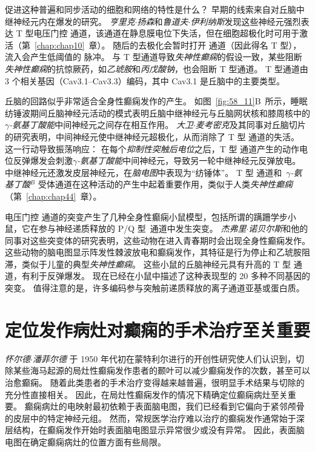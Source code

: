 促进这种普遍和同步活动的细胞和网络的特性是什么？
早期的线索来自对丘脑中继神经元内在爆发的研究。
\textit{亨里克$\cdot$扬森}和\textit{鲁道夫$\cdot$伊利纳斯}发现这些神经元强烈表达 T 型电压门控  通道，该通道在静息膜电位下失活，但在细胞超极化时可用于激活（第~\ref{chap:chap10}~章）。
随后的去极化会暂时打开  通道（因此得名 T 型）， 流入会产生低阈值的  脉冲。
与 T 型通道导致\textit{失神性癫痫}的假设一致，某些阻断\textit{失神性癫痫}的抗惊厥药，如\textit{乙琥胺}和\textit{丙戊酸钠}，也会阻断 T 型通道。
T 型通道由 3 个相关基因（Cav3.1–Cav3.3）编码，其中 Cav3.1 是丘脑中的主要类型。


丘脑的回路似乎非常适合全身性癫痫发作的产生。
如图~\ref{fig:58_11}B~所示，睡眠纺锤波期间丘脑神经元活动的模式表明丘脑中继神经元与丘脑网状核和膝周核中的\textit{$\gamma$-氨基丁酸能}中间神经元之间存在相互作用。
\textit{大卫$\cdot$麦考密克}及其同事对丘脑切片的研究表明，中间神经元使中继神经元超极化，从而消除了 T 型  通道的失活。
这一行动导致振荡响应：
在每个\textit{抑制性突触后电位}之后，T 型  通道产生的动作电位反弹爆发会刺激\textit{$\gamma$-氨基丁酸能}中间神经元，导致另一轮中继神经元反弹放电。
中继神经元还激发皮层神经元，在\textit{脑电图}中表现为“纺锤体”。
T 型  通道和~\textit{$\gamma$-氨基丁酸}$^B$ 受体通道在这种活动的产生中起着重要作用，类似于人类\textit{失神性癫痫}（第~\ref{chap:chap44}~章）。


电压门控  通道的突变产生了几种全身性癫痫小鼠模型，包括所谓的蹒跚学步小鼠，它在参与神经递质释放的 P/Q 型~通道中发生突变。
\textit{杰弗里$\cdot$诺贝尔斯}和他的同事对这些突变体的研究表明，这些动物在进入青春期时会出现全身性癫痫发作。
这些动物的脑电图显示阵发性棘波放电和癫痫发作，其特征是行为停止和乙琥胺阻滞，类似于儿童的典型\textit{失神性癫痫}。
这些小鼠的丘脑神经元具有升高的 T 型  通道，有利于反弹爆发。
现在已经在小鼠中描述了这种表现型的 20 多种不同基因的突变。
值得注意的是，许多编码参与突触前递质释放的离子通道亚基或蛋白质。



\section{定位发作病灶对癫痫的手术治疗至关重要}

\textit{怀尔德$\cdot$潘菲尔德 }于 1950 年代初在蒙特利尔进行的开创性研究使人们认识到，切除某些海马起源的局灶性癫痫发作患者的颞叶可以减少癫痫发作的次数，甚至可以治愈癫痫。
随着此类患者的手术治疗变得越来越普遍，很明显手术结果与切除的充分性直接相关。
因此，在局灶性癫痫发作的情况下精确定位癫痫病灶至关重要。
癫痫病灶的电映射最初依赖于表面脑电图，我们已经看到它偏向于紧邻颅骨的皮层中的特定神经元组。
然而，常规医学治疗难以治疗的癫痫发作通常始于深层结构，在癫痫发作开始时表面脑电图显示异常很少或没有异常。
因此，表面脑电图在确定癫痫病灶的位置方面有些局限。



